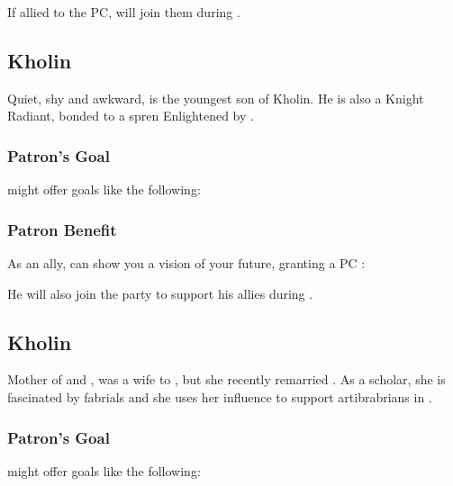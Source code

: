 If allied to the PC, \npcKaladin{} will join them during .





\subsection{\npcRenarinName{} Kholin}

Quiet, shy and awkward, \npcRenarin{} is the youngest son of \npcDalinar{} Kholin. He is also a Knight Radiant, bonded to a spren Enlightened by \npcSjaAnat{}.

\subsubsection{Patron's Goal}

\npcRenarin{} might offer goals like the following:


\subsubsection{Patron Benefit}

As an ally, \npcRenarin{} can show you a vision of your future, granting a PC \abilityFutureKnowledgeName[1]:

\abilityFutureKnowledge[1]

He will also join the party to support his allies during .



\subsection{\npcNavaniName{} Kholin}

Mother of \npcJasnah{} and \npcElhokar{}, \npcNavani{} was a wife to \npcDeadKing{}, but she recently remarried \npcDalinar{}. As a scholar, she is fascinated by fabrials and she uses her influence to support artibrabrians in \locationUrithiru{}.

\subsubsection{Patron's Goal}

\npcNavani{} might offer goals like the following:

